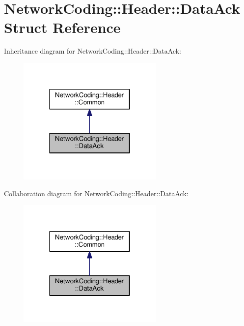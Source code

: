 \hypertarget{struct_network_coding_1_1_header_1_1_data_ack}{}\section{Network\+Coding\+:\+:Header\+:\+:Data\+Ack Struct Reference}
\label{struct_network_coding_1_1_header_1_1_data_ack}


Inheritance diagram for Network\+Coding\+:\+:Header\+:\+:Data\+Ack\+:\nopagebreak
\begin{figure}[H]
\begin{center}
\leavevmode
\includegraphics[width=202pt]{struct_network_coding_1_1_header_1_1_data_ack__inherit__graph}
\end{center}
\end{figure}


Collaboration diagram for Network\+Coding\+:\+:Header\+:\+:Data\+Ack\+:\nopagebreak
\begin{figure}[H]
\begin{center}
\leavevmode
\includegraphics[width=202pt]{struct_network_coding_1_1_header_1_1_data_ack__coll__graph}
\end{center}
\end{figure}
